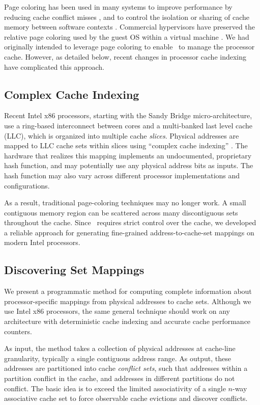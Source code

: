 Page coloring has been used in many systems to improve performance by
reducing cache conflict misses \cite{Bugnion-PageColoring}, and to
control the isolation or sharing of cache memory between software
contexts \cite{Zhang-PageColoring}.  Commercial hypervisors have
preserved the relative page coloring used by the guest OS within a
virtual machine \cite{Waldspurger-ESX}.  We had originally intended to
leverage page coloring to enable \vcage\ to manage the processor
cache.  However, as detailed below, recent changes in processor cache
indexing have complicated this approach.

\subsection{Complex Cache Indexing}

Recent Intel x86 processors, starting with the Sandy Bridge
micro-architecture, use a ring-based interconnect between cores and a
multi-banked last level cache (LLC), which is organized into multiple
cache {\em slices}.  Physical addresses are mapped to LLC cache sets
within slices using ``complex cache indexing''
\cite{Intel-Uncore-E5-2600,Intel-SDM}.  The hardware that realizes
this mapping implements an undocumented, proprietary hash function,
and may potentially use any physical address bits as inputs.  The hash
function may also vary across different processor implementations and
configurations.

As a result, traditional page-coloring techniques may no longer work.
A small contiguous memory region can be scattered across many
discontiguous sets throughout the cache.  Since \vcage\ requires
strict control over the cache, we developed a reliable approach for
generating fine-grained address-to-cache-set mappings on modern
Intel processors.

\subsection{Discovering Set Mappings}

We present a programmatic method for computing complete information
about processor-specific mappings from physical addresses to cache
sets. Although we use Intel x86 processors, the same general technique
should work on any architecture with deterministic cache indexing
and accurate cache performance counters.

As input, the method takes a collection of physical addresses at
cache-line granularity, typically a single contiguous address range.
As output, these addresses are partitioned into cache
{\em conflict sets}, such that addresses within a partition conflict
in the cache, and addresses in different partitions do not conflict.
The basic idea is to exceed the limited associativity of a
single $n$-way associative cache set to force observable cache
evictions and discover conflicts.

